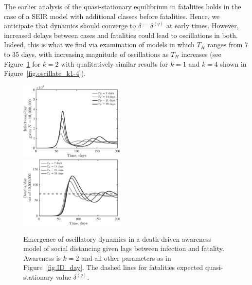 The earlier analysis of
the quasi-stationary equilibrium in fatalities holds in the
case of a SEIR model with additional classes before
fatalities. Hence,
we anticipate that dynamics should converge to $\delta=\delta^{(q)}$
at early times. However, increased delays between cases and
fatalities could lead to oscillations in both.  Indeed, this
is what we find via examination of models in which
$T_H$ ranges from 7 to 35 days, with increasing magnitude of
oscillations as $T_H$ increases (see Figure~\ref{fig.oscillate} 
for $k=2$ with qualitatively similar results for $k=1$ and
$k=4$ shown in Figure~\ref{fig.oscillate_k1-4}).

\begin{figure}[t!]
\begin{center}
\includegraphics[width=0.47\textwidth]{scripts/figseir_Hdel_k2_noname.pdf}\\
\includegraphics[width=0.47\textwidth]{scripts/figseir_Hdel_k2D_noname.pdf}
\caption{Emergence of oscillatory dynamics in a death-driven awareness
model of social distancing given lags between infection and fatality.
Awareness is $k=2$ and all other parameters as in Figure~\ref{fig.ID_day}.
The dashed
lines for fatalities expected quasi-stationary value $\delta^{(q)}$.
\label{fig.oscillate}}
\end{center}
\end{figure}

